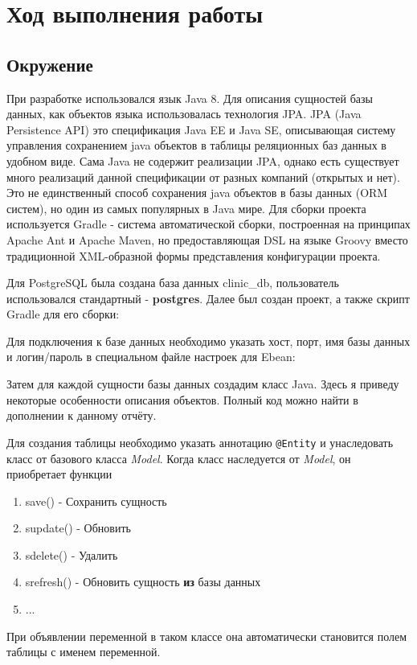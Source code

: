 \documentclass[a4paper]{article}
\begin{document}
\section{Ход выполнения работы}
\subsection{Окружение}
При разработке использовался язык Java 8.
Для описания сущностей базы данных, как объектов языка использовалась технология JPA. JPA (Java Persistence API) это спецификация Java EE и Java SE, описывающая систему управления сохранением java объектов в таблицы реляционных баз данных в удобном виде. Сама Java не содержит реализации JPA, однако есть существует много реализаций данной спецификации от разных компаний (открытых и нет). Это не единственный способ сохранения java объектов в базы данных (ORM систем), но один из самых популярных в Java мире.
Для сборки проекта используется Gradle - система автоматической сборки, построенная на принципах Apache Ant и Apache Maven, но предоставляющая DSL на языке Groovy вместо традиционной XML-образной формы представления конфигурации проекта.

Для PostgreSQL была создана база данных clinic\_db, пользователь использовался стандартный - \textbf{postgres}. Далее был
создан проект, а также скрипт Gradle для его сборки:


Для подключения к базе данных необходимо указать хост, порт, имя базы данных и логин/пароль в специальном файле настроек для Ebean:


Затем для каждой сущности базы данных создадим класс Java. Здесь я приведу некоторые особенности описания объектов. Полный код можно найти в дополнении к данному отчёту.

Для создания таблицы необходимо указать аннотацию \lstinline[]|@Entity| и унаследовать класс от базового класса \textit{Model}. Когда класс наследуется от \textit{Model}, он приобретает функции 
\begin{enumerate}
	\item save() - Сохранить сущность
	\item supdate() - Обновить
	\item sdelete() - Удалить
	\item srefresh() - Обновить сущность \textbf{из} базы данных
	\item ...
\end{enumerate}
При объявлении переменной в таком классе она автоматически становится полем таблицы с именем переменной. \\
\end{document}
